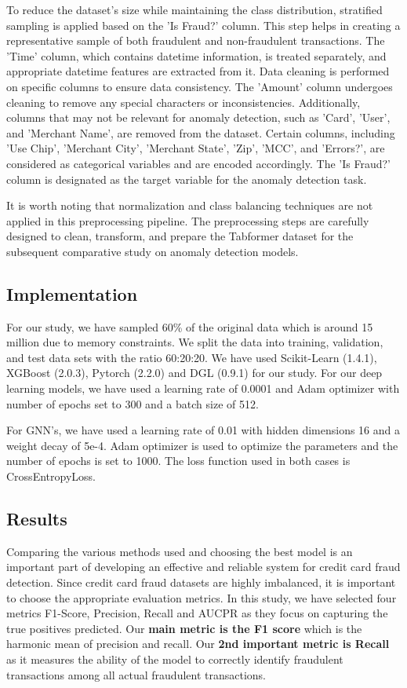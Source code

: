 \documentclass[pdflatex,sn-mathphys-num]{sn-jnl}%
\begin{document}
To reduce the dataset's size while maintaining the class distribution, stratified sampling is applied based on the 'Is Fraud?' column. This step helps in creating a representative sample of both fraudulent and non-fraudulent transactions. The 'Time' column, which contains datetime information, is treated separately, and appropriate datetime features are extracted from it. Data cleaning is performed on specific columns to ensure data consistency. The 'Amount' column undergoes cleaning to remove any special characters or inconsistencies. Additionally, columns that may not be relevant for anomaly detection, such as 'Card', 'User', and 'Merchant Name', are removed from the dataset. Certain columns, including 'Use Chip', 'Merchant City', 'Merchant State', 'Zip', 'MCC', and 'Errors?', are considered as categorical variables and are encoded accordingly. The 'Is Fraud?' column is designated as the target variable for the anomaly detection task.

It is worth noting that normalization and class balancing techniques are not applied in this preprocessing pipeline. The preprocessing steps are carefully designed to clean, transform, and prepare the Tabformer dataset for the subsequent comparative study on anomaly detection models.

\subsection{Implementation}\label{subsec4}

For our study, we have sampled 60\% of the original data which is around 15 million due to memory constraints. We split the data into training, validation, and test data sets with the ratio 60:20:20. We have used Scikit-Learn (1.4.1), XGBoost (2.0.3), Pytorch (2.2.0) and DGL (0.9.1) for our study. For our deep learning models, we have used a learning rate of 0.0001 and Adam optimizer with number of epochs set to 300 and a batch size of 512.

For GNN’s, we have used a learning rate of 0.01 with hidden dimensions 16 and a weight decay of 5e-4. Adam optimizer is used to optimize the parameters and the number of epochs is set to 1000. The loss function used in both cases is CrossEntropyLoss.

\subsection{Results}\label{subsec4}

Comparing the various methods used and choosing the best model is an important part of developing an effective and reliable system for credit card fraud detection. Since credit card fraud datasets are highly imbalanced, it is important to choose the appropriate evaluation metrics. In this study, we have selected four metrics F1-Score, Precision, Recall and AUCPR as they focus on capturing the true positives predicted. Our \textbf{main metric is the F1 score} which is the harmonic mean of precision and recall. Our \textbf{2nd important metric is Recall} as it measures the ability of the model to correctly identify fraudulent transactions among all actual fraudulent transactions. 
\end{document}
